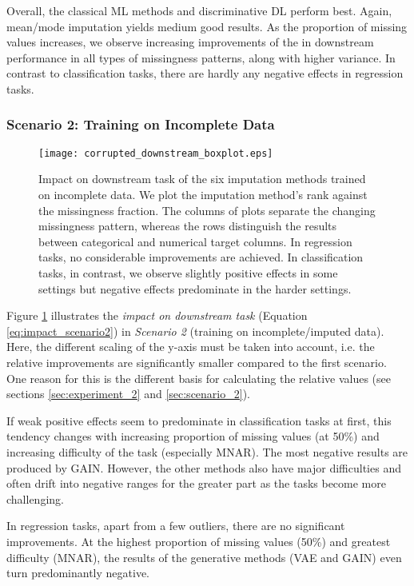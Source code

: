 Overall, the classical ML methods and discriminative DL perform best. Again, mean/mode imputation yields medium good results. As the proportion of missing values increases, we observe increasing improvements of the in downstream performance in all types of missingness patterns, along with higher variance. In contrast to classification tasks, there are hardly any negative effects in regression tasks.


\subsubsection{Scenario 2: Training on Incomplete Data}

\begin{figure}\centering
	\texttt{[image: corrupted\_downstream\_boxplot.eps]}

	\caption[Downstream Ranks - Corrupted]{Impact on downstream task of the six imputation methods trained on incomplete data. We plot the imputation method's rank against the missingness fraction. The columns of plots separate the changing missingness pattern, whereas the rows distinguish the results between categorical and numerical target columns. In regression tasks, no considerable improvements are achieved. In classification tasks, in contrast, we observe slightly positive effects in some settings but negative effects predominate in the harder settings.
    }
	\label{fig:corrupted_downstream_boxplot}
\end{figure}

Figure \ref{fig:corrupted_downstream_boxplot} illustrates the \textit{impact on downstream task} (Equation \ref{eq:impact_scenario2}) in \textit{Scenario 2} (training on incomplete/imputed data). Here, the different scaling of the y-axis must be taken into account, i.e. the relative improvements are significantly smaller compared to the first scenario. One reason for this is the different basis for calculating the relative values (see sections \ref{sec:experiment_2} and \ref{sec:scenario_2}).

If weak positive effects seem to predominate in classification tasks at first, this tendency changes with increasing proportion of missing values (at 50\%) and increasing difficulty of the task (especially MNAR). The most negative results are produced by GAIN. However, the other methods also have major difficulties and often drift into negative ranges for the greater part as the tasks become more challenging.

In regression tasks, apart from a few outliers, there are no significant improvements. At the highest proportion of missing values (50\%) and greatest difficulty (MNAR), the results of the generative methods (VAE and GAIN) even turn predominantly negative.

